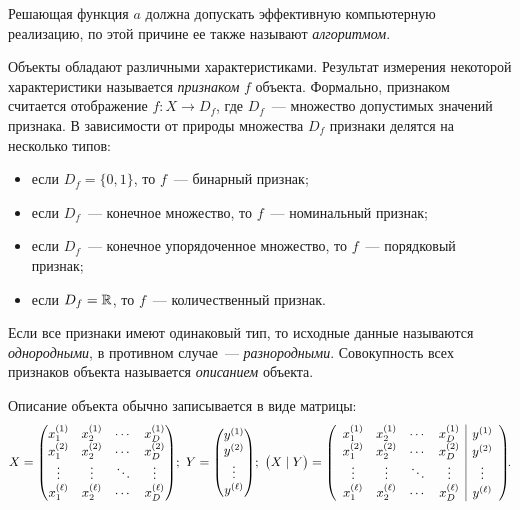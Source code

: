 Решающая функция \( a \) должна допускать эффективную компьютерную реализацию, по этой причине ее также
называют \emph{алгоритмом}.

Объекты обладают различными характеристиками. Результат измерения некоторой характеристики называется
\emph{признаком} \( f \) объекта. Формально, признаком считается отображение \( f\colon X \to D_f \),
где \( D_f \)~--- множество допустимых значений признака. В зависимости от природы множества \( D_f \)
признаки делятся на несколько типов:
\begin{itemize}
  \vspace*{-.8em}
  \itemsep -5pt
  \item если \( D_f = \{ 0, 1 \} \), то \( f \)~--- бинарный признак;
  \item если \( D_f \)~--- конечное множество, то \( f \)~--- номинальный признак;
  \item если \( D_f \)~--- конечное упорядоченное множество, то \( f \)~--- порядковый признак;
  \item если \( D_f = \mathbb{R} \), то \( f \)~--- количественный признак.
\end{itemize}
Если все признаки имеют одинаковый тип, то исходные данные называются \emph{однородными}, в противном
случае~--- \emph{разнородными}. Совокупность всех признаков объекта называется \emph{описанием}
объекта.

Описание объекта обычно записывается в виде матрицы:
\[
  X =
  \begin{pmatrix}
    x_1^{(1)}  & x_2^{(1)}  & \cdots & x_D^{(1)}  \\
    x_1^{(2)}  & x_2^{(2)}  & \cdots & x_D^{(2)}  \\
    \vdots     & \vdots     & \ddots & \vdots     \\
    x_1^{(\l)} & x_2^{(\l)} & \cdots & x_D^{(\l)}
  \end{pmatrix}\!;\
  Y =
  \begin{pmatrix}
    y^{(1)} \\
    y^{(2)} \\
    \vdots  \\
    y^{(\l)}
  \end{pmatrix}\!;\
  \bigl(X\mid Y\bigr) = \mleft(
  \begin{array}{cccc|c}
    x_1^{(1)}  & x_2^{(1)}  & \cdots & x_D^{(1)}  & y^{(1)} \\
    x_1^{(2)}  & x_2^{(2)}  & \cdots & x_D^{(2)}  & y^{(2)} \\
    \vdots     & \vdots     & \ddots & \vdots     & \vdots  \\
    x_1^{(\l)} & x_2^{(\l)} & \cdots & x_D^{(\l)} & y^{(\l)}
  \end{array}\mright)\!.
\]

